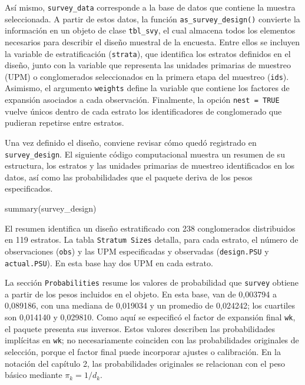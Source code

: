 \documentclass[
  spanish,
  11pt,
  letterpaper,
  oneside,
  open=any]{scrbook}
\newenvironment{Shaded}{\begin{snugshade}}{\end{snugshade}}
\newcommand{\FunctionTok}[1]{\textcolor[rgb]{0.28,0.35,0.67}{#1}}
\newcommand{\NormalTok}[1]{\textcolor[rgb]{0.00,0.23,0.31}{#1}}
\begin{document}
Así mismo, \texttt{survey\_data} corresponde a la base de datos que
contiene la muestra seleccionada. A partir de estos datos, la función
\texttt{as\_survey\_design()} convierte la información en un objeto de
clase \texttt{tbl\_svy}, el cual almacena todos los elementos necesarios
para describir el diseño muestral de la encuesta. Entre ellos se
incluyen la variable de estratificación (\texttt{strata}), que
identifica los estratos definidos en el diseño, junto con la variable
que representa las unidades primarias de muestreo (UPM) o conglomerados
seleccionados en la primera etapa del muestreo (\texttt{ids}). Asimismo,
el argumento \texttt{weights} define la variable que contiene los
factores de expansión asociados a cada observación. Finalmente, la
opción \texttt{nest\ =\ TRUE} vuelve únicos dentro de cada estrato los
identificadores de conglomerado que pudieran repetirse entre estratos.

Una vez definido el diseño, conviene revisar cómo quedó registrado en
\texttt{survey\_design}. El siguiente código computacional muestra un
resumen de su estructura, los estratos y las unidades primarias de
muestreo identificados en los datos, así como las probabilidades que el
paquete deriva de los pesos especificados.

\begin{Shaded}
\begin{Highlighting}[]
\FunctionTok{summary}\NormalTok{(survey\_design)}
\end{Highlighting}
\end{Shaded}

El resumen identifica un diseño estratificado con 238 conglomerados
distribuidos en 119 estratos. La tabla \texttt{Stratum\ Sizes} detalla,
para cada estrato, el número de observaciones (\texttt{obs}) y las UPM
especificadas y observadas (\texttt{design.PSU} y \texttt{actual.PSU}).
En esta base hay dos UPM en cada estrato.

La sección \texttt{Probabilities} resume los valores de probabilidad que
\texttt{survey} obtiene a partir de los pesos incluidos en el objeto. En
esta base, van de 0,003794 a 0,089186, con una mediana de 0,019034 y un
promedio de 0,024242; los cuartiles son 0,014140 y 0,029810. Como aquí
se especificó el factor de expansión final \texttt{wk}, el paquete
presenta sus inversos. Estos valores describen las probabilidades
implícitas en \texttt{wk}; no necesariamente coinciden con las
probabilidades originales de selección, porque el factor final puede
incorporar ajustes o calibración. En la notación del capítulo 2, las
probabilidades originales se relacionan con el peso básico mediante
\(\pi_k=1/d_k\).
\end{document}
